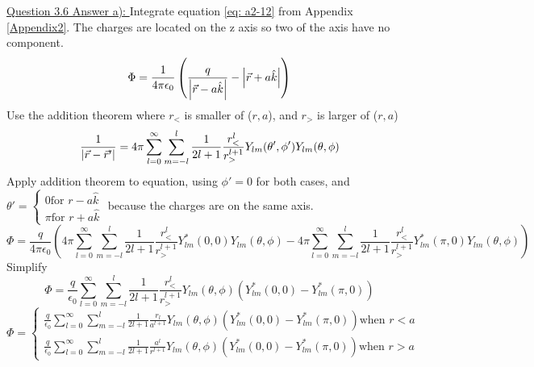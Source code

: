 \documentclass[12pt]{article}
\begin{document}
    \underline{Question 3.6 Answer a): }
    Integrate equation \ref{eq: a2-12} from Appendix \ref{Appendix2}. The charges are located on the z axis so two of the axis have no component.
    \begin{equation} \label{eq: 3.6-15}
        \Phi = \frac{1}{4 \pi \epsilon_0} \left(\frac{q}{\abs{\vec{r} - a \hat{k}}} - \abs{\vec{r} + a \hat{k}}\right)
    \end{equation}
    Use the addition theorem where $r_<$ is smaller of ($r,a$), and $r_>$ is larger of ($r,a$)
    \begin{equation} \label{eq: 3.6-16}
        \frac{1}{\abs{\vec{r}-\vec{r}'}} = 4 \pi \sum_{l=0}^\infty \sum_{m=-l}^l \frac{1}{2l+1} \frac{r_<^l}{r_>^{l+1}} Y_{lm}(\theta', \phi') Y_{lm}(\theta, \phi) 
    \end{equation}
    Apply addition theorem to equation, using $\phi'=0$ for both cases, 
    \newline and $\theta'=\begin{cases} 0 \text{for $r-a\hat{k}$} \\ \pi \text{for $r+a\hat{k}$} \end{cases}$ because the charges are on the same axis.
    \begin{equation} \label{eq: 3.6-17}
        \Phi = \frac{q}{4 \pi \epsilon_0} \left(4 \pi \sum_{l=0}^\infty \sum_{m=-l}^l \frac{1}{2l+1} \frac{r_<^l}{r_>^{l+1}} Y_{lm}^*(0, 0) Y_{lm}(\theta, \phi) -4 \pi \sum_{l=0}^\infty \sum_{m=-l}^l \frac{1}{2l+1} \frac{r_<^l}{r_>^{l+1}} Y_{lm}^*(\pi, 0) Y_{lm}(\theta, \phi)  \right)
    \end{equation}
    Simplify
    \begin{equation} \label{eq: 3.6-18}
        \Phi = \frac{q}{\epsilon_0} \sum_{l=0}^\infty \sum_{m=-l}^l \frac{1}{2l+1} \frac{r_<^l}{r_>^{l+1}} Y_{lm}(\theta, \phi) \left( Y_{lm}^*(0, 0) - Y_{lm}^*(\pi, 0) \right)
    \end{equation}
    \begin{equation} \label{eq: 3.6-19}
        \Phi = 
        \begin{cases}
            \frac{q}{\epsilon_0} \sum_{l=0}^\infty \sum_{m=-l}^l \frac{1}{2l+1} \frac{r_l}{a^{l+1}} Y_{lm}(\theta, \phi) \left( Y_{lm}^*(0, 0) - Y_{lm}^*(\pi, 0) \right) \text{when $r<a$}
            \\
            \frac{q}{\epsilon_0} \sum_{l=0}^\infty \sum_{m=-l}^l \frac{1}{2l+1} \frac{a^l}{r^{l+1}} Y_{lm}(\theta, \phi) \left( Y_{lm}^*(0, 0) - Y_{lm}^*(\pi, 0) \right) \text{when $r>a$}
        \end{cases}
    \end{equation}
\end{document}

